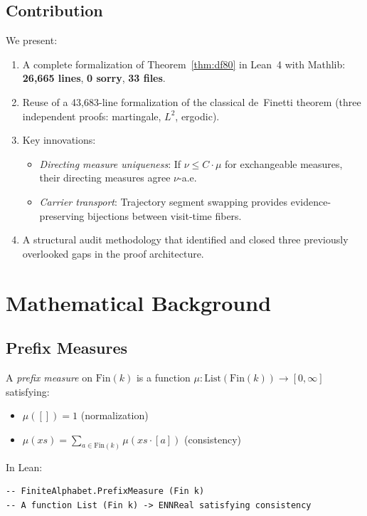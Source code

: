 \documentclass[11pt,a4paper]{article}
\theoremstyle{definition}
\begin{document}
\subsection{Contribution}

We present:
\begin{enumerate}
\item A complete formalization of Theorem~\ref{thm:df80} in Lean~4 with Mathlib:
  \textbf{26,665 lines}, \textbf{0 sorry}, \textbf{33 files}.
\item Reuse of a 43,683-line formalization of the classical de~Finetti theorem
  (three independent proofs: martingale, $L^2$, ergodic).
\item Key innovations:
  \begin{itemize}
  \item \emph{Directing measure uniqueness}: If $\nu \leq C \cdot \mu$ for
    exchangeable measures, their directing measures agree $\nu$-a.e.
  \item \emph{Carrier transport}: Trajectory segment swapping provides
    evidence-preserving bijections between visit-time fibers.
  \end{itemize}
\item A structural audit methodology that identified and closed three
  previously overlooked gaps in the proof architecture.
\end{enumerate}

\section{Mathematical Background}

\subsection{Prefix Measures}

A \emph{prefix measure} on $\mathrm{Fin}(k)$ is a function
$\mu : \mathrm{List}(\mathrm{Fin}(k)) \to [0, \infty]$ satisfying:
\begin{itemize}
\item $\mu([]) = 1$ (normalization)
\item $\mu(xs) = \sum_{a \in \mathrm{Fin}(k)} \mu(xs \cdot [a])$ (consistency)
\end{itemize}

In Lean:
\begin{lstlisting}
-- FiniteAlphabet.PrefixMeasure (Fin k)
-- A function List (Fin k) -> ENNReal satisfying consistency
\end{lstlisting}
\end{document}
